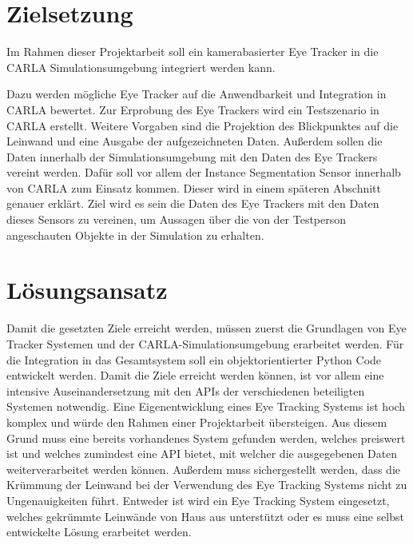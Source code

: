\section{Zielsetzung}

Im Rahmen dieser Projektarbeit soll ein kamerabasierter Eye Tracker in die CARLA Simulationsumgebung integriert werden kann.

Dazu werden mögliche Eye Tracker auf die Anwendbarkeit und Integration in CARLA bewertet. Zur Erprobung des Eye Trackers wird ein Testszenario in CARLA erstellt. Weitere Vorgaben sind die Projektion des Blickpunktes auf die Leinwand und eine Ausgabe der aufgezeichneten Daten. Außerdem sollen die Daten innerhalb der Simulationsumgebung mit den Daten des Eye Trackers vereint werden. Dafür soll vor allem der Instance Segmentation Sensor innerhalb von CARLA zum Einsatz kommen. Dieser wird in einem späteren Abschnitt genauer erklärt. Ziel wird es sein die Daten des Eye Trackers mit den Daten dieses Sensors zu vereinen, um Aussagen über die von der Testperson angeschauten Objekte in der Simulation zu erhalten.  


\section{Lösungsansatz}

Damit die gesetzten Ziele erreicht werden, müssen zuerst die Grundlagen von Eye Tracker Systemen und der CARLA-Simulationsumgebung erarbeitet werden. Für die Integration in das Gesamtsystem soll ein objektorientierter Python Code entwickelt werden. Damit die Ziele erreicht werden können, ist vor allem eine intensive Auseinandersetzung mit den APIs der verschiedenen beteiligten Systemen notwendig. Eine Eigenentwicklung eines Eye Tracking Systems ist hoch komplex und würde den Rahmen einer Projektarbeit übersteigen. Aus diesem Grund muss eine bereits vorhandenes System gefunden werden, welches preiswert ist und welches zumindest eine API bietet, mit welcher die ausgegebenen Daten weiterverarbeitet werden können. Außerdem muss sichergestellt werden, dass die Krümmung der Leinwand bei der Verwendung des Eye Tracking Systems nicht zu Ungenauigkeiten führt. Entweder ist wird ein Eye Tracking System eingesetzt, welches gekrümmte Leinwände von Haus aus unterstützt oder es muss eine selbst entwickelte Lösung erarbeitet werden. 






